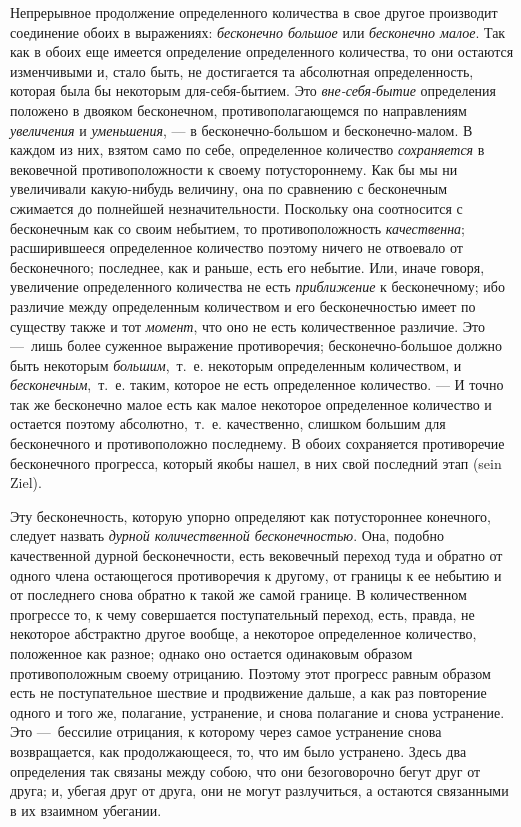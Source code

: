 {Непрерывное продолжение определенного количества в свое другое производит
соединение обоих в выражениях: {\em бесконечно большое}
или {\em бесконечно малое}. Так как в обоих еще имеется
определение определенного количества, то они остаются изменчивыми и, стало
быть, не достигается та абсолютная определенность, которая была бы
некоторым для-себя-бытием. Это {\em вне-себя-бытие}
определения положено в двояком бесконечном, противополагающемся по
направлениям {\em увеличения} и
{\em уменьшения}, — в бесконечно-большом и
бесконечно-малом. В каждом из них, взятом само по себе, определенное
количество {\em сохраняется} в вековечной
противоположности к своему потустороннему. Как бы мы ни увеличивали
какую-нибудь величину, она по сравнению с бесконечным сжимается до
полнейшей незначительности. Поскольку она соотносится с бесконечным как со
своим небытием, то противоположность {\em качественна};
расширившееся определенное количество поэтому ничего не отвоевало от
бесконечного; последнее, как и раньше, есть его небытие. Или, иначе говоря,
увеличение определенного количества не есть
{\em приближение} к бесконечному; ибо различие между
определенным количеством и его бесконечностью имеет по существу также и тот
{\em момент}, что оно не есть количественное различие.
Это —~лишь более суженное выражение противоречия; бесконечно-большое должно
быть некоторым {\em большим},~т.~е. некоторым
определенным количеством, и {\em бесконечным},~т.~е.
таким, которое не есть определенное количество. — И точно так же бесконечно
малое есть как малое некоторое определенное количество и остается поэтому
абсолютно,~т.~е. качественно, слишком большим для бесконечного и
противоположно последнему. В обоих сохраняется противоречие бесконечного
прогресса, который якобы нашел, в них свой последний этап (sein Ziel).

Эту бесконечность, которую упорно определяют как потустороннее конечного,
следует назвать {\em дурной количественной
бесконечностью}. Она, подобно качественной дурной бесконечности, есть
вековечный переход туда и обратно от одного члена остающегося противоречия
к другому, от границы к ее небытию и от последнего снова обратно к такой же
самой границе. В количественном прогрессе то, к чему совершается
поступательный переход, есть, правда, не некоторое абстрактно другое
вообще, а некоторое определенное количество, положенное как разное; однако
оно остается одинаковым образом противоположным своему отрицанию. Поэтому
этот прогресс равным образом есть не поступательное шествие и продвижение
дальше, а как раз повторение одного и того же, полагание, устранение, и
снова полагание и снова устранение. Это —~бессилие отрицания, к которому
через самое устранение снова возвращается, как продолжающееся, то, что им
было устранено. Здесь два определения так связаны между собою, что они
безоговорочно бегут друг от друга; и, убегая друг от друга, они не могут
разлучиться, а остаются связанными в их взаимном убегании.

}
